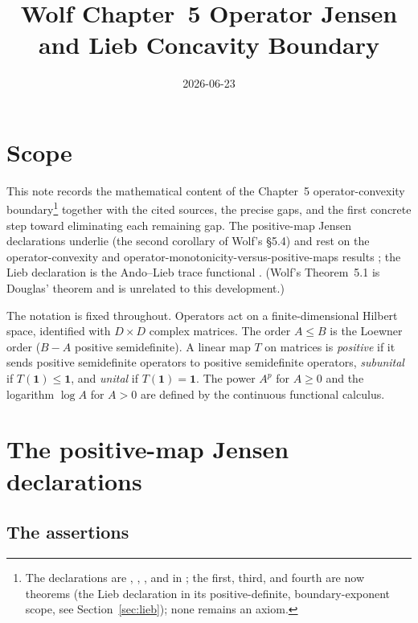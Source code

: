 \documentclass{article}
\title{Wolf Chapter~5 Operator Jensen and Lieb Concavity Boundary}
\author{}
\date{2026-06-23}
\begin{document}
\maketitle
{}

\section{Scope}

This note records the mathematical content of the Chapter~5
operator-convexity boundary\footnote{%
    The declarations are
    , ,
    , and  in
    ; the first, third, and fourth are
    now theorems (the Lieb declaration in its positive-definite, boundary-exponent
    scope, see Section~\ref{sec:lieb}); none remains an axiom.}
together with the cited sources, the precise gaps, and the first concrete step
toward eliminating each remaining gap.  The positive-map Jensen declarations
underlie \cite[Corollary~5.2]{Wolf2012Quantum} (the second corollary of Wolf's
\S5.4) and rest on the operator-convexity and
operator-monotonicity-versus-positive-maps results
\cite[Theorems~5.10--5.13]{Wolf2012Quantum}; the Lieb declaration is the
Ando--Lieb trace functional \cite[Theorem~5.15]{Wolf2012Quantum}.  (Wolf's Theorem~5.1 is
Douglas' theorem and is unrelated to this development.)

The notation is fixed throughout.  Operators act on a finite-dimensional Hilbert
space, identified with $D\times D$ complex matrices.  The order $A\le B$ is the
Loewner order ($B-A$ positive semidefinite).  A linear map $T$ on matrices is
\emph{positive} if it sends positive semidefinite operators to positive
semidefinite operators, \emph{subunital} if $T(\mathbf 1)\le\mathbf 1$, and
\emph{unital} if $T(\mathbf 1)=\mathbf 1$.  The power $A^p$ for $A\ge 0$ and the
logarithm $\log A$ for $A>0$ are defined by the continuous functional calculus.

\section{The positive-map Jensen declarations}

\subsection{The assertions}\label{ssec:assertions}
\end{document}
